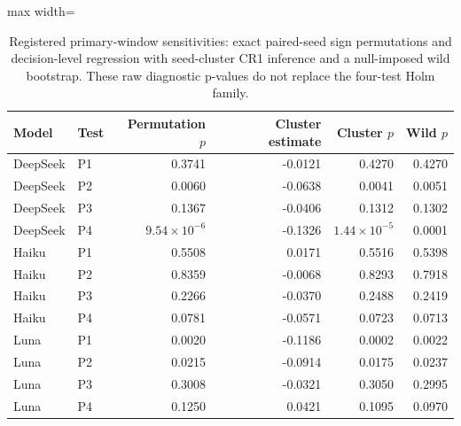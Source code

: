 \begin{table}[tbp]
\caption{Registered primary-window sensitivities: exact paired-seed sign permutations and decision-level regression with seed-cluster CR1 inference and a null-imposed wild bootstrap. These raw diagnostic p-values do not replace the four-test Holm family.}
\label{tab:sensitivity}
\centering\footnotesize
\setlength{\tabcolsep}{4pt}
\begin{adjustbox}{max width=\linewidth}
\begin{tabular}{llrrrr}
\toprule
Model & Test & Permutation $p$ & Cluster estimate & Cluster $p$ & Wild $p$ \\
\midrule
DeepSeek & P1 & 0.3741 & -0.0121 & 0.4270 & 0.4270 \\
DeepSeek & P2 & 0.0060 & -0.0638 & 0.0041 & 0.0051 \\
DeepSeek & P3 & 0.1367 & -0.0406 & 0.1312 & 0.1302 \\
DeepSeek & P4 & \(9.54\times10^{-6}\) & -0.1326 & \(1.44\times10^{-5}\) & 0.0001 \\
Haiku & P1 & 0.5508 & 0.0171 & 0.5516 & 0.5398 \\
Haiku & P2 & 0.8359 & -0.0068 & 0.8293 & 0.7918 \\
Haiku & P3 & 0.2266 & -0.0370 & 0.2488 & 0.2419 \\
Haiku & P4 & 0.0781 & -0.0571 & 0.0723 & 0.0713 \\
Luna & P1 & 0.0020 & -0.1186 & 0.0002 & 0.0022 \\
Luna & P2 & 0.0215 & -0.0914 & 0.0175 & 0.0237 \\
Luna & P3 & 0.3008 & -0.0321 & 0.3050 & 0.2995 \\
Luna & P4 & 0.1250 & 0.0421 & 0.1095 & 0.0970 \\
\bottomrule
\end{tabular}
\end{adjustbox}
\end{table}
